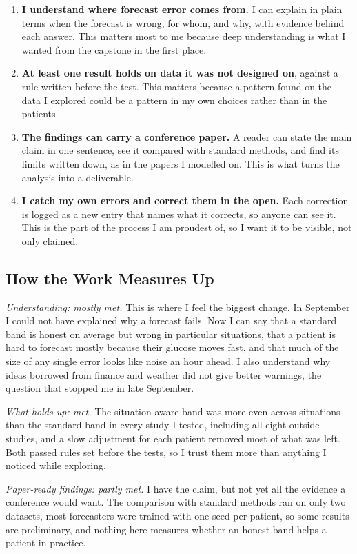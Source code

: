 \begin{enumerate}
\item \textbf{I understand where forecast error comes from.} I can explain in plain terms when the forecast is wrong, for whom, and why, with evidence behind each answer. This matters most to me because deep understanding is what I wanted from the capstone in the first place.
\item \textbf{At least one result holds on data it was not designed on}, against a rule written before the test. This matters because a pattern found on the data I explored could be a pattern in my own choices rather than in the patients.
\item \textbf{The findings can carry a conference paper.} A reader can state the main claim in one sentence, see it compared with standard methods, and find its limits written down, as in the papers I modelled on. This is what turns the analysis into a deliverable.
\item \textbf{I catch my own errors and correct them in the open.} Each correction is logged as a new entry that names what it corrects, so anyone can see it. This is the part of the process I am proudest of, so I want it to be visible, not only claimed.
\end{enumerate}

\subsection{How the Work Measures Up}

\textit{Understanding: mostly met.} This is where I feel the biggest change. In September I could not have explained why a forecast fails. Now I can say that a standard band is honest on average but wrong in particular situations, that a patient is hard to forecast mostly because their glucose moves fast, and that much of the size of any single error looks like noise an hour ahead. I also understand why ideas borrowed from finance and weather did not give better warnings, the question that stopped me in late September.

\textit{What holds up: met.} The situation-aware band was more even across situations than the standard band in every study I tested, including all eight outside studies, and a slow adjustment for each patient removed most of what was left. Both passed rules set before the tests, so I trust them more than anything I noticed while exploring.

\textit{Paper-ready findings: partly met.} I have the claim, but not yet all the evidence a conference would want. The comparison with standard methods ran on only two datasets, most forecasters were trained with one seed per patient, so some results are preliminary, and nothing here measures whether an honest band helps a patient in practice.

